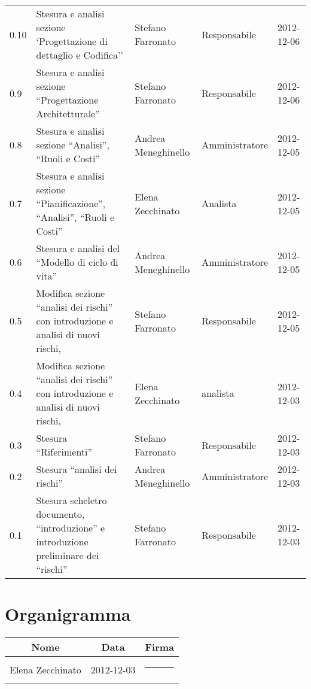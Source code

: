 \begin{longtable}{lp{}lll}
0.10 &Stesura e analisi sezione `Progettazione di dettaglio e Codifica'' & Stefano Farronato & Responsabile & 2012-12-06\\
0.9 &Stesura e analisi sezione ``Progettazione Architetturale'' & Stefano Farronato & Responsabile & 2012-12-06\\
0.8 &Stesura e analisi sezione ``Analisi'', ``Ruoli e Costi'' & Andrea Meneghinello & Amministratore & 2012-12-05\\
0.7 &Stesura e analisi sezione ``Pianificazione'', ``Analisi'', ``Ruoli e Costi'' & Elena Zecchinato & Analista & 2012-12-05\\
0.6 &Stesura e analisi del ``Modello di ciclo di vita'' & Andrea Meneghinello & Amministratore & 2012-12-05\\
0.5 &Modifica sezione ``analisi dei rischi'' con introduzione e analisi di nuovi rischi, & Stefano Farronato & Responsabile & 2012-12-05\\
0.4 & Modifica sezione ``analisi dei rischi'' con introduzione e analisi di nuovi rischi, & Elena Zecchinato & analista & 2012-12-03\\
0.3 & Stesura ``Riferimenti'' & Stefano Farronato & Responsabile & 2012-12-03\\
0.2 & Stesura ``analisi dei rischi'' & Andrea Meneghinello & Amministratore & 2012-12-03\\
0.1 & Stesura scheletro documento, ``introduzione'' e introduzione preliminare dei ``rischi'' & Stefano Farronato & Responsabile & 2012-12-03\\
\bottomrule
\end{longtable}
\newpage



\setcounter{page}{1}
\pagestyle{normal}

\section{Organigramma}
\begin{center}
\begin{tabularx}{0.8\textwidth}{c|c|c}
{\bf Nome}&{\bf Data}&{\bf Firma}\\ 
\hline
\multirow{2}{*}{Elena Zecchinato} &\multirow{2}{*}{ 2012-12-03} &\rule{3cm}{0cm} \\&&\\
\end{tabularx}
\end{center}

